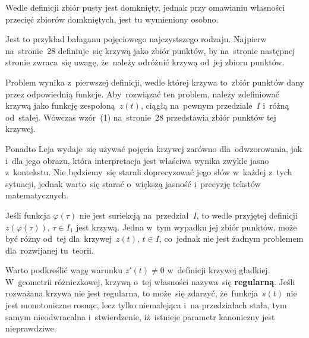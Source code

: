 \documentclass[a4paper,11pt]{article}
\begin{document}
\vspace{\spaceFour}



\start {} Wedle definicji zbiór pusty jest domknięty, jednak
przy omawianiu własności przecięć zbiorów domkniętych, jest tu
wymieniony osobno.

\vspace{\spaceFour}



\start {} Jest to przykład bałaganu pojęciowego
najczystszego rodzaju. Najpierw na~stronie~28 definiuje~się krzywą
jako zbiór punktów, by na~stronie następnej stronie zwraca~się uwagę,
że~należy odróżnić krzywą od~jej zbioru punktów.

Problem wynika z~pierwszej definicji, wedle której krzywa to~zbiór
punktów dany przez odpowiednią funkcje. Aby~rozwiązać ten problem,
należy zdefiniować krzywą jako funkcję zespoloną~$z( t )$, ciągłą
na~pewnym przedziale~$I$ i~różną od~stałej. Wówczas wzór~(1)
na~stronie~28 przedstawia zbiór punktów tej krzywej.

Ponadto Leja wydaje~się używać pojęcia krzywej zarówno
dla~odwzorowania, jak i~dla jego obrazu, która interpretacja jest
właściwa wynika zwykle jasno z~kontekstu. Nie będziemy~się starali
doprecyzować jego słów w~każdej z~tych sytuacji, jednak warto~się
starać o~większą jasność i~precyzję tekstów matematycznych.

\vspace{\spaceFour}



\start {} Jeśli funkcja $\varphi( \tau )$ nie jest suriekcją
na~przedział~$I$, to wedle przyjętej definicji~$z( \varphi( \tau ) )$,
$\tau \in I_{ 1 }$ jest krzywą. Jedna w~tym wypadku jej zbiór punktów,
może być różny od~tej dla~krzywej~$z( t )$, $t \in I$, co~jednak nie
jest żadnym problemem dla~rozwijanej tu~teorii.

\vspace{\spaceFour}



\start {} Warto podkreślić wagę warunku $z'( t ) \neq 0$
w~definicji krzywej gładkiej. W~geometrii różniczkowej, krzywą o~tej
własności nazywa~się \textbf{regularną}. Jeśli rozważana krzywa nie
jest regularna, to może~się zdarzyć, że~funkcja~$s( t )$ nie jest
monotoniczne rosnąc, lecz tylko niemalejąca i~na przedziałach stała,
tym samym nieodwracalna i~stwierdzenie, iż~istnieje parametr
kanoniczny jest nieprawdziwe.
\end{document}
